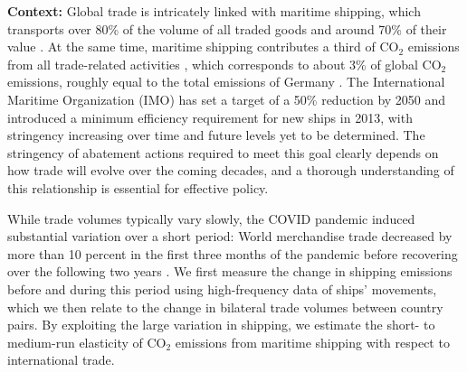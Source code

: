 \documentclass[hidelinks, 12pt,letterpaper]{article}
\begin{document}
\noindent \textbf{Context:} 
Global trade is intricately linked with maritime shipping, which transports over 80\% of the volume of all traded goods and around 70\% of their value .
At the same time, maritime shipping contributes a third of CO$_2$ emissions from all trade-related activities \citep{shapiro2016trade}, which corresponds to
about 3\% of global CO$_2$ emissions, roughly equal to the total emissions of Germany \citep{faber2020fourth}. The International Maritime Organization (IMO) has set a target of a 50\% reduction by 2050 and introduced a minimum efficiency requirement for new ships in 2013, with stringency increasing over time and future levels yet to be determined.    %
The stringency of abatement actions required to meet this goal clearly depends on how trade will evolve over the coming decades, and a thorough understanding of this relationship is essential for effective policy.  %



While trade volumes typically vary slowly, the COVID pandemic induced substantial variation over a short period:
World merchandise trade decreased by more than 10 percent in the first three months of the pandemic before recovering over the following two years \citep{oecd21}. %
We first measure the change in shipping emissions before and during this period using high-frequency data of ships' movements, which we then relate to the change in bilateral trade volumes between country pairs. By exploiting the large variation in shipping, we estimate the short- to medium-run elasticity of CO$_2$ emissions from maritime shipping with respect to international trade. %
\end{document}
